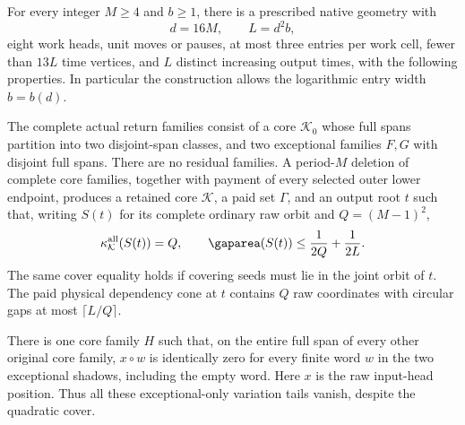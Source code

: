 \begin{proposition}
\label{prop:serial-quadratic-cover}
For every integer $M\ge4$ and $b\ge1$, there is a prescribed native
geometry with
\[
 d=16M,\qquad L=d^2b,
\]
eight work heads, unit moves or pauses, at most three entries per work
cell, fewer than $13L$ time vertices, and $L$ distinct increasing output
times, with the following properties.  In particular the construction
allows the logarithmic entry width $b=b(d)$.

The complete actual return families consist of a core $\mathcal K_0$
whose full spans partition into two disjoint-span classes, and two
exceptional families $F,G$ with disjoint full spans.  There are no
residual families.  A period-$M$ deletion of complete core families,
together with payment of every selected outer lower endpoint, produces
a retained core $\mathcal K$, a paid set $\Gamma$, and an output root
$t$ such that, writing $S(t)$ for its complete ordinary raw orbit and
$Q=(M-1)^2$,
\begin{equation}
 \kappa_{\mathcal K}^{\rm all}(S(t))=Q,
 \qquad
 \gaparea(S(t))\le\frac1{2Q}+\frac1{2L}.
 \label{eq:serial-cover-conclusions}
\end{equation}
The same cover equality holds if covering seeds must lie in the joint
orbit of $t$.  The paid physical dependency cone at $t$ contains $Q$
raw coordinates with circular gaps at most $\lceil L/Q\rceil$.

There is one core family $H$ such that, on the entire full span of every
other original core family, $x\circ w$ is identically zero for every
finite word $w$ in the two exceptional shadows, including the empty
word.  Here $x$ is the raw input-head position.  Thus all these
exceptional-only variation tails vanish, despite the quadratic cover.
\end{proposition}

